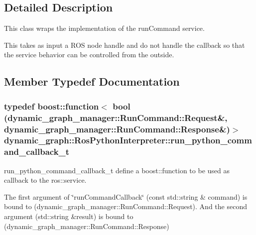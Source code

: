 \subsection{Detailed Description}
This class wraps the implementation of the run\+Command service. 

This takes as input a R\+OS node handle and do not handle the callback so that the service behavior can be controlled from the outside. 

\subsection{Member Typedef Documentation}
\subsubsection[{\texorpdfstring{run\+\_\+python\+\_\+command\+\_\+callback\+\_\+t}{run_python_command_callback_t}}]{\setlength{\rightskip}{0pt plus 5cm}typedef boost\+::function$<$ bool (dynamic\+\_\+graph\+\_\+manager\+::\+Run\+Command\+::\+Request\&, dynamic\+\_\+graph\+\_\+manager\+::\+Run\+Command\+::\+Response\&)$>$ {\bf dynamic\+\_\+graph\+::\+Ros\+Python\+Interpreter\+::run\+\_\+python\+\_\+command\+\_\+callback\+\_\+t}}\hypertarget{classdynamic__graph_1_1RosPythonInterpreter_aa9fcb34973d84db722fa39803d11c00d}{}\label{classdynamic__graph_1_1RosPythonInterpreter_aa9fcb34973d84db722fa39803d11c00d}


run\+\_\+python\+\_\+command\+\_\+callback\+\_\+t define a boost\+::function to be used as callback to the ros\+::service. 

The first argument of \char`\"{}run\+Command\+Callback\char`\"{} (const std\+::string \& command) is bound to (dynamic\+\_\+graph\+\_\+manager\+::\+Run\+Command\+::\+Request). And the second argument (std\+::string \&result) is bound to (dynamic\+\_\+graph\+\_\+manager\+::\+Run\+Command\+::\+Response) 
